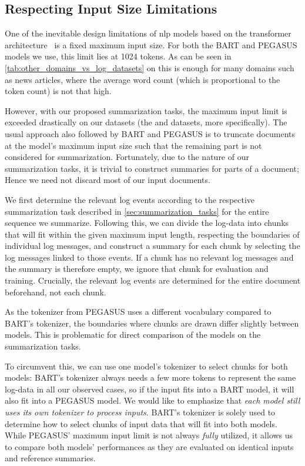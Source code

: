 \subsection{Respecting Input Size Limitations}\label{subsec:input_size_limitations}

One of the inevitable design limitations of \ac{nlp} models based on the transformer architecture~\parencite{transformer}
is a fixed maximum input size.
For both the BART and PEGASUS models we use, this limit lies at 1024 tokens.
As can be seen in \autoref{tab:other_domains_vs_log_datasets} on 
this is enough for many domains such as news articles,
where the average word count (which is proportional to the token count) is not that high.

However, with our proposed summarization tasks, the maximum input limit is exceeded drastically on our datasets
(the \hadoop{} and \telco{} datasets, more specifically).
The usual approach also followed by BART and PEGASUS is to truncate documents
at the model's maximum input size such that the remaining part is not considered for summarization.
Fortunately, due to the nature of our summarization tasks, it is trivial to construct summaries for parts of a document;
Hence we need not discard most of our input documents.

We first determine the relevant log events according to the respective summarization task described in \autoref{sec:summarization_tasks}
for the entire sequence we summarize.
Following this, we can divide the log-data into chunks that will fit within the given maximum input length,
respecting the boundaries of individual log messages,
and construct a summary for each chunk by selecting the log messages linked to those events.
If a chunk has no relevant log messages and the summary is therefore empty, we ignore that chunk for evaluation and training.
Crucially, the relevant log events are determined for the entire document beforehand, not each chunk.

As the tokenizer from PEGASUS uses a different vocabulary compared to BART's tokenizer,
the boundaries where chunks are drawn differ slightly between models.
This is problematic for direct comparison of the models on the summarization tasks.

To circumvent this, we can use one model's tokenizer to select chunks for both models:
BART's tokenizer always needs a few more tokens to represent the same log-data in all our observed cases,
so if the input fits into a BART model, it will also fit into a PEGASUS model.
We would like to emphasize that \emph{each model still uses its own tokenizer to process inputs}.
BART's tokenizer is solely used to determine how to select chunks of input data that will fit into both models.
While PEGASUS' maximum input limit is not always \emph{fully} utilized,
it allows us to compare both models' performances as they are evaluated on identical inputs and reference summaries.

